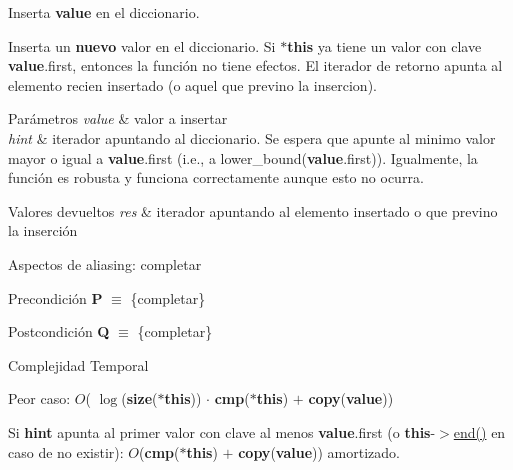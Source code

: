 Inserta {\bfseries value} en el diccionario. 

Inserta un {\bfseries nuevo} valor en el diccionario. Si {\bfseries $\ast$this} ya tiene un valor con clave {\bfseries value}.first, entonces la función no tiene efectos. El iterador de retorno apunta al elemento recien insertado (o aquel que previno la insercion).


\begin{DoxyParams}{Parámetros}
{\em value} & valor a insertar \\
\hline
{\em hint} & iterador apuntando al diccionario. Se espera que apunte al minimo valor mayor o igual a {\bfseries value}.first (i.\+e., a lower\+\_\+bound({\bfseries value}.first)). Igualmente, la función es robusta y funciona correctamente aunque esto no ocurra. \\
\hline
\end{DoxyParams}

\begin{DoxyRetVals}{Valores devueltos}
{\em res} & iterador apuntando al elemento insertado o que previno la inserción\\
\hline
\end{DoxyRetVals}
\begin{DoxyParagraph}{Aspectos de aliasing\+:}
completar
\end{DoxyParagraph}
\begin{DoxyPrecond}{Precondición}
{\bfseries P} $\equiv$ \{completar\} 
\end{DoxyPrecond}
\begin{DoxyPostcond}{Postcondición}
{\bfseries Q} $\equiv$ \{completar\}
\end{DoxyPostcond}

\begin{DoxyDescription}
\item[Complejidad Temporal]
\begin{DoxyItemize}
\item Peor caso\+: $O$( $\log$({\bfseries size}({\bfseries $\ast$this})) $\cdot$ {\bfseries cmp}({\bfseries $\ast$this}) $+$ {\bfseries copy}({\bfseries value}))
\item Si {\bfseries hint} apunta al primer valor con clave al menos {\bfseries value}.first (o {\bfseries this}-\/$>$\hyperlink{classaed2_1_1map_a76023e6a56cb625513e1b5ea028bf983_a76023e6a56cb625513e1b5ea028bf983}{end()} en caso de no existir)\+: $O$({\bfseries cmp}({\bfseries $\ast$this}) $+$ {\bfseries copy}({\bfseries value})) amortizado. 
\end{DoxyItemize}
\end{DoxyDescription}

